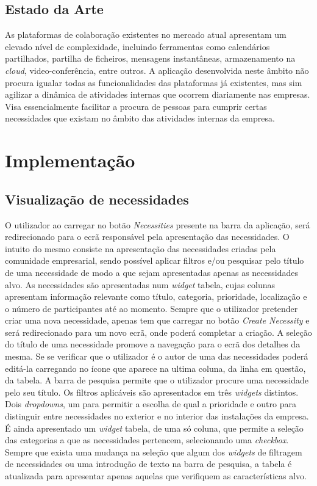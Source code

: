 \documentclass[a4paper,openright,11pt]{report}
\begin{document}
\subsection*{Estado da Arte}
As plataformas de colaboração existentes no mercado atual apresentam um elevado nível de complexidade, incluindo ferramentas como calendários partilhados, partilha de ficheiros, mensagens instantâneas, armazenamento na \textit{cloud}, video-conferência, entre outros. A aplicação desenvolvida neste âmbito não procura igualar todas as funcionalidades das plataformas já existentes, mas sim agilizar a dinâmica de atividades internas que ocorrem diariamente nas empresas. Visa essencialmente facilitar a procura de pessoas para cumprir certas necessidades que existam no âmbito das atividades internas da empresa.

\section*{Implementação}

\subsection*{Visualização de necessidades}\label{sec:necessities}

O utilizador ao carregar no botão \textit{Necessities} presente na barra da aplicação, será redirecionado para o ecrã responsável pela apresentação das necessidades. 
O intuito do mesmo consiste na apresentação das necessidades criadas pela comunidade empresarial, sendo possível aplicar filtros e/ou pesquisar pelo título de uma necessidade de modo a que sejam apresentadas apenas as necessidades alvo.
As necessidades são apresentadas num \textit{widget} tabela, cujas colunas apresentam informação relevante como título, categoria, prioridade, localização e o número de participantes até ao momento. Sempre que o utilizador pretender criar uma nova necessidade, apenas tem que carregar no botão \textit{Create Necessity} e será redirecionado para um novo ecrã, onde poderá completar a criação.
A seleção do título de uma necessidade promove a navegação para o ecrã dos detalhes da mesma. Se se verificar que o utilizador é o autor de uma das necessidades poderá editá-la carregando no ícone que aparece na ultima coluna, da linha em questão, da tabela.
A barra de pesquisa permite que o utilizador procure uma necessidade pelo seu título.
Os filtros aplicáveis são apresentados em três \textit{widgets} distintos. Dois \textit{dropdowns}, um para permitir a escolha de qual a prioridade e outro para distinguir entre necessidades no exterior e no interior das instalações da empresa.
É ainda apresentado um \textit{widget} tabela, de uma só coluna, que permite a seleção das categorias a que as necessidades pertencem, selecionando uma \textit{checkbox}.  
Sempre que exista uma mudança na seleção que algum dos \textit{widgets} de filtragem de necessidades ou uma introdução de texto na barra de pesquisa, a tabela é atualizada para apresentar apenas aquelas que verifiquem as características alvo. 
\end{document}

